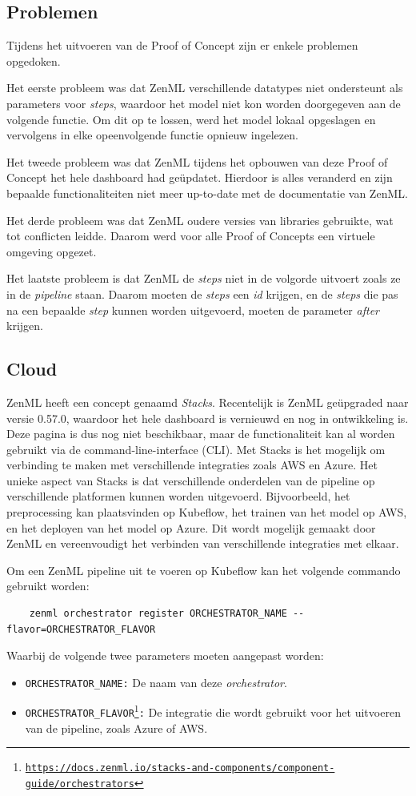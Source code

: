 \subsection{Problemen}
Tijdens het uitvoeren van de Proof of Concept zijn er enkele problemen opgedoken.

Het eerste probleem was dat ZenML verschillende datatypes niet ondersteunt als parameters voor \textit{steps}, waardoor het model niet kon worden doorgegeven aan de volgende functie. Om dit op te lossen, werd het model lokaal opgeslagen en vervolgens in elke opeenvolgende functie opnieuw ingelezen.

Het tweede probleem was dat ZenML tijdens het opbouwen van deze Proof of Concept het hele dashboard had geüpdatet. Hierdoor is alles veranderd en zijn bepaalde functionaliteiten niet meer up-to-date met de documentatie van ZenML.

Het derde probleem was dat ZenML oudere versies van libraries gebruikte, wat tot conflicten leidde. Daarom werd voor alle Proof of Concepts een virtuele omgeving opgezet.

Het laatste probleem is dat ZenML de \textit{steps} niet in de volgorde uitvoert zoals ze in de \textit{pipeline} staan. Daarom moeten de \textit{steps} een \textit{id} krijgen, en de \textit{steps} die pas na een bepaalde \textit{step} kunnen worden uitgevoerd, moeten de parameter \textit{after} krijgen.
\subsection{Cloud}
ZenML heeft een concept genaamd \textit{Stacks}. Recentelijk is ZenML geüpgraded naar versie 0.57.0, waardoor het hele dashboard is vernieuwd en nog in ontwikkeling is. Deze pagina is dus nog niet beschikbaar, maar de functionaliteit kan al worden gebruikt via de command-line-interface (CLI).
Met Stacks is het mogelijk om verbinding te maken met verschillende integraties zoals AWS en Azure. Het unieke aspect van Stacks is dat verschillende onderdelen van de pipeline op verschillende platformen kunnen worden uitgevoerd. Bijvoorbeeld, het preprocessing kan plaatsvinden op Kubeflow, het trainen van het model op AWS, en het deployen van het model op Azure. Dit wordt mogelijk gemaakt door ZenML en vereenvoudigt het verbinden van verschillende integraties met elkaar.

Om een ZenML pipeline uit te voeren op Kubeflow kan het volgende commando gebruikt worden:
\begin{verbatim}
    zenml orchestrator register ORCHESTRATOR_NAME --flavor=ORCHESTRATOR_FLAVOR
\end{verbatim}
Waarbij de volgende twee parameters moeten aangepast worden:
\begin{itemize}
    \item \texttt{ORCHESTRATOR\_NAME:} De naam van deze \textit{orchestrator}.
    \item \texttt{ORCHESTRATOR\_FLAVOR\footnote{\url{https://docs.zenml.io/stacks-and-components/component-guide/orchestrators}}:} De integratie die wordt gebruikt voor het uitvoeren van de pipeline, zoals Azure of AWS.
\end{itemize}

